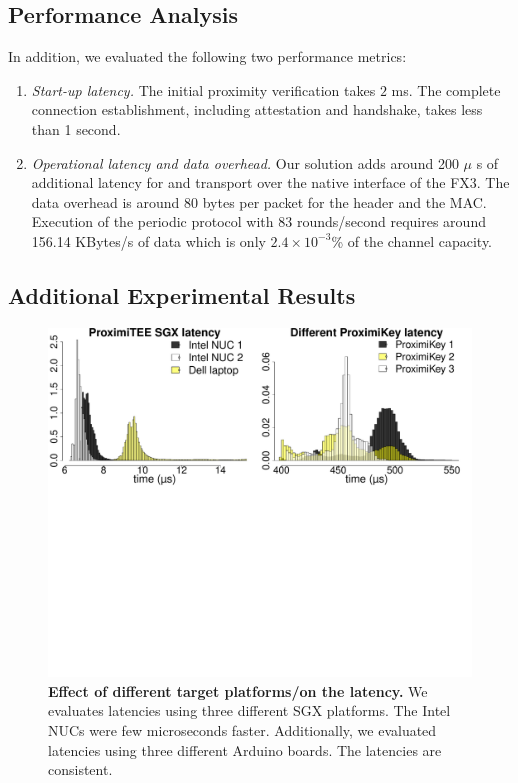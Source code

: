 \subsection{Performance Analysis}

In addition, we evaluated the following two performance metrics:

\begin{enumerate}
  \item \emph{Start-up latency.} The initial proximity verification takes $2$ ms. The complete connection establishment, including attestation and \tls handshake, takes less than 1 second.  
  


  \item \emph{Operational latency and data overhead.} Our solution adds around 200 $\mu$ s of additional latency for \tls and transport over the native \usb interface of the FX3. The data overhead is around 80 bytes per packet for the header and the MAC. Execution of the periodic \name protocol with 83 rounds/second requires around 156.14 KBytes/s of data which is only $2.4 \times 10^{-3}$\% of the  channel capacity. 


\end{enumerate}


\subsection{Additional Experimental Results}


\begin{figure}[t]
  \centering
    \includegraphics[trim={0 18cm 0 0}, clip, width=\linewidth]{chapters/ProximiTEE/data/graph/PlatformDevice_1.pdf}
    \caption[Effect of different target platforms/\device on the latency.]{\textbf{Effect of different target platforms/\device on the latency.} We evaluates latencies using three different SGX platforms. The Intel NUCs were few microseconds faster. Additionally, we evaluated latencies using three different Arduino boards. The latencies are consistent.}
    \label{graph:sgxLatency}
\end{figure}

